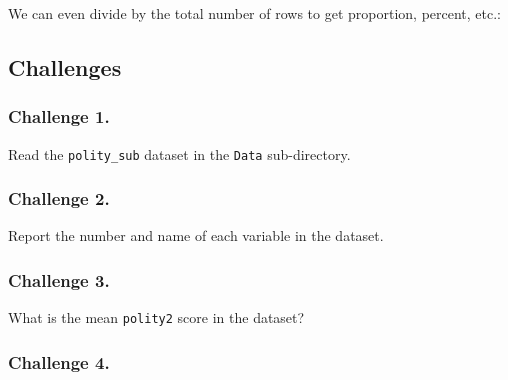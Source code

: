 \documentclass[
]{book}
\newenvironment{Shaded}{\begin{snugshade}}{\end{snugshade}}
\newcommand{\CommentTok}[1]{\textcolor[rgb]{0.56,0.35,0.01}{\textit{#1}}}
\newcommand{\DecValTok}[1]{\textcolor[rgb]{0.00,0.00,0.81}{#1}}
\newcommand{\KeywordTok}[1]{\textcolor[rgb]{0.13,0.29,0.53}{\textbf{#1}}}
\newcommand{\NormalTok}[1]{#1}
\newcommand{\OperatorTok}[1]{\textcolor[rgb]{0.81,0.36,0.00}{\textbf{#1}}}
\begin{document}
We can even divide by the total number of rows to get proportion, percent, etc.:

\begin{Shaded}
\end{Shaded}

\hypertarget{challenges-5}{%
\subsection{Challenges}\label{challenges-5}}

\hypertarget{challenge-1.-2}{%
\subsubsection*{Challenge 1.}\label{challenge-1.-2}}

Read the \texttt{polity\_sub} dataset in the \texttt{Data} sub-directory.

\hypertarget{challenge-2.-1}{%
\subsubsection*{Challenge 2.}\label{challenge-2.-1}}

Report the number and name of each variable in the dataset.

\hypertarget{challenge-3.-1}{%
\subsubsection*{Challenge 3.}\label{challenge-3.-1}}

What is the mean \texttt{polity2} score in the dataset?

\hypertarget{challenge-4.}{%
\subsubsection*{Challenge 4.}\label{challenge-4.}}
\end{document}
